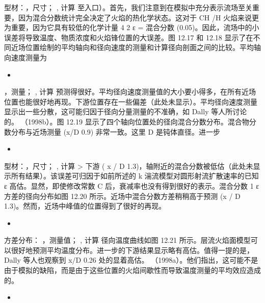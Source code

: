 \documentclass[11pt,a4paper,openany,fontset=none]{ctexbook}
\begin{document}
型材：，尺寸； , 计算
至入口）。首先，我们注意到在模拟中充分表示流场至关重要，因为混合分数统计完全决定了火焰的热化学状态。这对于 CH /H 火焰来说更为重要，因为它具有较低的化学计量 4 2 ε = 混合分数 (0.05)。因此，流场中的小误差将导致温度、物质浓度和火焰锋位置的大误差。图 12.17 和 12.18 显示了在不同近场位置绘制的平均轴向和径向速度的测量和计算径向剖面之间的比较。平均轴向速度测量为

\begin{itemize}

\item 

\end{itemize}

，测量； , 计算
预测得很好。平均径向速度测量值的大小要小得多，在所有近场位置也能很好地再现。下游位置存在一些偏差（此处未显示）。平均径向速度测量显示出一些分散，这可能归因于径向分量测量的不准确，如 Dally 等人所讨论的。 （1998b）。图 12.19 显示了四个轴向位置处的径向混合分数分布。混合物分数分布与近场测量 (x/D 0.9) 非常一致。这里 D 是钝体直径。进一步

\begin{itemize}

\item 

\end{itemize}

型材：，尺寸； , 计算
> 下游 ( x / D 1.3)，轴附近的混合分数被低估（此处未显示所有结果）。该误差可归因于如前所述的 k 湍流模型对圆形射流扩散速率的已知 ε 高估。显然，即使修改常数 C 后，衰减率也没有得到很好的表示。混合分数 1 ε 方差的径向分布如图 12.20 所示。近场中混合分数方差稍稍高于预测 (x / D 1.3)。然而，近场中峰值的位置得到了很好的再现。

\begin{itemize}

\item 

\end{itemize}

方差分布： ，测量值； , 计算
径向温度曲线如图 12.21 所示。层流火焰面模型可以很好地预测平均温度分布。进一步的下游结果显示略有高估。值得一提的是，Dally 等人也观察到 x/D 0.26 处的显着高估。 （1998a）。他们指出，这可能不是由于模拟的缺陷，而是由于这些位置的火焰间歇性而导致温度测量的平均效应造成的。

\begin{itemize}

\item 

\end{itemize}
\end{document}
